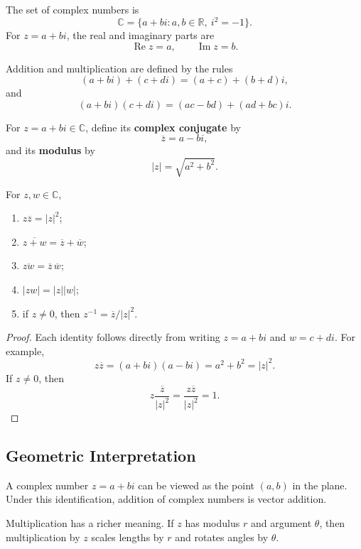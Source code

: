 \begin{definition}
The set of complex numbers is
\[
    \mathbb{C}=\{a+bi:a,b\in\mathbb{R},\ i^2=-1\}.
\]
For $z=a+bi$, the real and imaginary parts are
\[
    \operatorname{Re}z=a,
    \qquad
    \operatorname{Im}z=b.
\]
\end{definition}

Addition and multiplication are defined by the rules
\[
    (a+bi)+(c+di)=(a+c)+(b+d)i,
\]
and
\[
    (a+bi)(c+di)=(ac-bd)+(ad+bc)i.
\]

\begin{definition}
For $z=a+bi\in\mathbb{C}$, define its \textbf{complex conjugate} by
\[
    \overline{z}=a-bi,
\]
and its \textbf{modulus} by
\[
    |z|=\sqrt{a^2+b^2}.
\]
\end{definition}

\begin{proposition}
For $z,w\in\mathbb{C}$,
\begin{enumerate}
    \item $z\overline{z}=|z|^2$;
    \item $\overline{z+w}=\overline{z}+\overline{w}$;
    \item $\overline{zw}=\overline{z}\,\overline{w}$;
    \item $|zw|=|z||w|$;
    \item if $z\neq 0$, then $z^{-1}=\overline{z}/|z|^2$.
\end{enumerate}
\end{proposition}

\begin{proof}
Each identity follows directly from writing $z=a+bi$ and $w=c+di$. For example,
\[
    z\overline{z}=(a+bi)(a-bi)=a^2+b^2=|z|^2.
\]
If $z\neq 0$, then
\[
    z\frac{\overline{z}}{|z|^2}=\frac{z\overline{z}}{|z|^2}=1.
\]
\end{proof}

\subsection{Geometric Interpretation}

A complex number $z=a+bi$ can be viewed as the point $(a,b)$ in the plane. Under this identification, addition of complex numbers is vector addition.

Multiplication has a richer meaning. If $z$ has modulus $r$ and argument $\theta$, then multiplication by $z$ scales lengths by $r$ and rotates angles by $\theta$.

